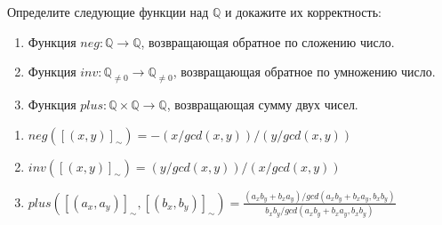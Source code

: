 \begin{task}[5]
Определите следующие функции над $\mathbb{Q}$ и докажите их корректность:
\begin{enumerate}[label=(\alph*)]
	\item Функция $neg : \mathbb{Q} \to \mathbb{Q}$, возвращающая обратное по сложению число.
	\item Функция $inv : \mathbb{Q}_{\neq 0} \to \mathbb{Q}_{\neq 0}$, возвращающая обратное по умножению число.
	\item Функция $plus : \mathbb{Q} \times \mathbb{Q} \to \mathbb{Q}$, возвращающая сумму двух чисел.
\end{enumerate}
\end{task}
\begin{solution}
\begin{enumerate}[label=(\alph*)]
	\item $neg([(x,y)]_{\sim}) = -(x / gcd(x,y) )/(y / gcd(x,y))$
	\item $inv([(x,y)]_{\sim}) = (y / gcd(x,y) )/(x / gcd(x,y))$
	\item $plus([(a_x,a_y)]_{\sim}, [(b_x,b_y)]_{\sim}) = \frac{(a_xb_y + b_xa_y) / gcd(a_xb_y + b_xa_y,b_xb_y)}{b_xb_y / gcd(a_xb_y + b_xa_y,b_xb_y)}$
\end{enumerate}
\end{solution}

